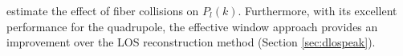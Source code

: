                                                                                                                                                                                                                                                                             estimate the effect of fiber collisions on $P_l(k)$. Furthermore, with its
                                                                                                                                                                                                                                                                            excellent performance for the quadrupole, the effective window approach 
                                                                                                                                                                                                                                                                            provides an improvement over the LOS reconstruction method (Section
                                                                                                                                                                                                                                                                            \ref{sec:dlospeak}). 


